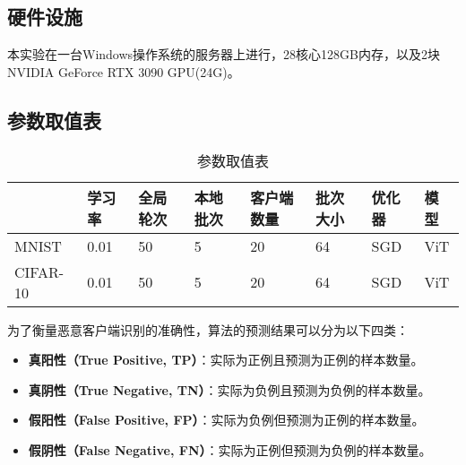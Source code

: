 \documentclass[lettersize,journal]{IEEEtran}
\begin{document}
\subsection{硬件设施}

本实验在一台Windows操作系统的服务器上进行，28核心128GB内存，以及2块NVIDIA GeForce RTX 3090 GPU(24G)。

\subsection{参数取值表}



\begin{table*}[t]  %
\small
\centering
\begin{tabularx}{\textwidth}{|X|X|X|X|X|X|X|X|}  %
\hline
& 学习率 & 全局轮次 & 本地批次 & 客户端数量 & 批次大小 & 优化器 & 模型 \\
\hline
MNIST & 0.01 & 50 & 5 & 20 & 64 & SGD & ViT \\
CIFAR-10 & 0.01 & 50 & 5 & 20 & 64 & SGD & ViT \\
\hline
\end{tabularx}
\caption{参数取值表}
\end{table*}


为了衡量恶意客户端识别的准确性，算法的预测结果可以分为以下四类：

\begin{itemize}
    \item \textbf{真阳性（True Positive, TP）}：实际为正例且预测为正例的样本数量。
    \item \textbf{真阴性（True Negative, TN）}：实际为负例且预测为负例的样本数量。
    \item \textbf{假阳性（False Positive, FP）}：实际为负例但预测为正例的样本数量。
    \item \textbf{假阴性（False Negative, FN）}：实际为正例但预测为负例的样本数量。
\end{itemize}
\end{document}
